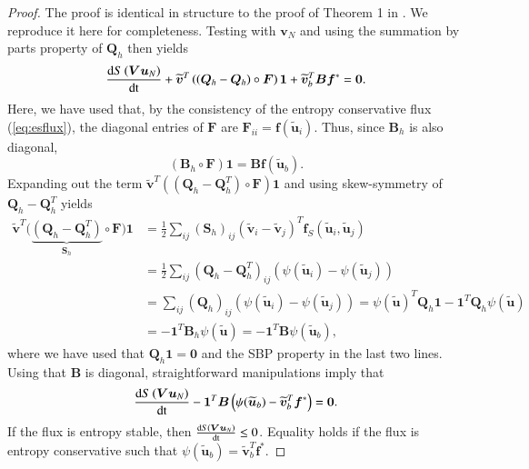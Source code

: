 \documentclass[preprint,10pt]{elsarticle}
\theoremstyle{definition}
\theoremstyle{lemma}
\theoremstyle{theorem}
\theoremstyle{assumption}
\renewcommand{\tilde}{\widetilde}
\newcommand{\td}[2]{\frac{{\rm d}#1}{{\rm d}{\rm #2}}}
\newcommand{\LRp}[1]{\left( #1 \right)}
\newcommand{\note}[1]{{\color{blue}{#1}}}
\begin{document}
\begin{proof}
The proof is identical in structure to the proof of Theorem 1 in \cite{chan2017discretely}.  We reproduce it here for completeness.
Testing with $\bm{v}_N$ and using the summation by parts property of $\bm{Q}_h$ then yields 
\begin{align*}
\td{S\LRp{\bm{V}\bm{u}_N}}{t}  + \tilde{\bm{v}}^T\LRp{\LRp{\bm{Q}_h-\bm{Q}_h} \circ \bm{F}}\bm{1} + \tilde{\bm{v}}_b^T\bm{B}\bm{f}^*  = \bm{0}.
\end{align*}
Here, we have used that, by the consistency of the entropy conservative flux (\ref{eq:esflux}), the diagonal entries of $\bm{F}$ are $\bm{F}_{ii} = \bm{f}\LRp{\tilde{\bm{u}}_i}$.  Thus, since $\bm{B}_h$ is also diagonal,
\[
\LRp{\bm{B}_h\circ\bm{F}}\bm{1} = \bm{B} \bm{f}(\tilde{\bm{u}}_b).
\]
Expanding out the term $\tilde{\bm{v}}^T\LRp{\LRp{\bm{Q}_h-\bm{Q}_h^T} \circ \bm{F}}\bm{1}$ and using skew-symmetry of $\bm{Q}_h-\bm{Q}_h^T$ yields
\begin{align*}
\tilde{\bm{v}}^T\big(\underbrace{\LRp{\bm{Q}_h-\bm{Q}_h^T}}_{\bm{S}_h} \circ \bm{F}\big)\bm{1} &= 
\frac{1}{2}\sum_{ij} \LRp{\bm{S}_h}_{ij} \LRp{\tilde{\bm{v}}_i-\tilde{\bm{v}}_j}^T\bm{f}_S\LRp{\tilde{\bm{u}}_i,\tilde{\bm{u}}_j}\\
&= \frac{1}{2}\sum_{ij} \LRp{\bm{Q}_h-\bm{Q}_h^T}_{ij} \LRp{\psi(\tilde{\bm{u}}_i)-\psi(\tilde{\bm{u}}_j)}\\
&= \sum_{ij} \LRp{\bm{Q}_h}_{ij} \LRp{\psi(\tilde{\bm{u}}_i)-\psi(\tilde{\bm{u}}_j)} = {\psi(\tilde{\bm{u}})^T\bm{Q}_h\bm{1} - \bm{1}^T\bm{Q}_h\psi(\tilde{\bm{u}})}\\
& = -\bm{1}^T\bm{B}_h\psi(\tilde{\bm{u}}) = -\bm{1}^T\bm{B}\psi(\tilde{\bm{u}}_b),
\end{align*}
where we have used that $\bm{Q}_h\bm{1} = \bm{0}$ and the SBP property in the last two lines.  Using that $\bm{B}$ is diagonal, straightforward manipulations imply that
\[
\td{S\LRp{\bm{V}\bm{u}_N}}{t}  - \bm{1}^T\bm{B}\LRp{\psi(\tilde{\bm{u}}_b)-\tilde{\bm{v}}_b^T\bm{f}^*}  = \bm{0}.
\]
If the flux is entropy stable, then $\td{S\LRp{\bm{V}\bm{u}_N}}{t} \leq 0$.  Equality holds if the flux is entropy conservative such that $\psi(\tilde{\bm{u}}_b)=\tilde{\bm{v}}_b^T\bm{f}^*$.
\end{proof}

\end{document}
